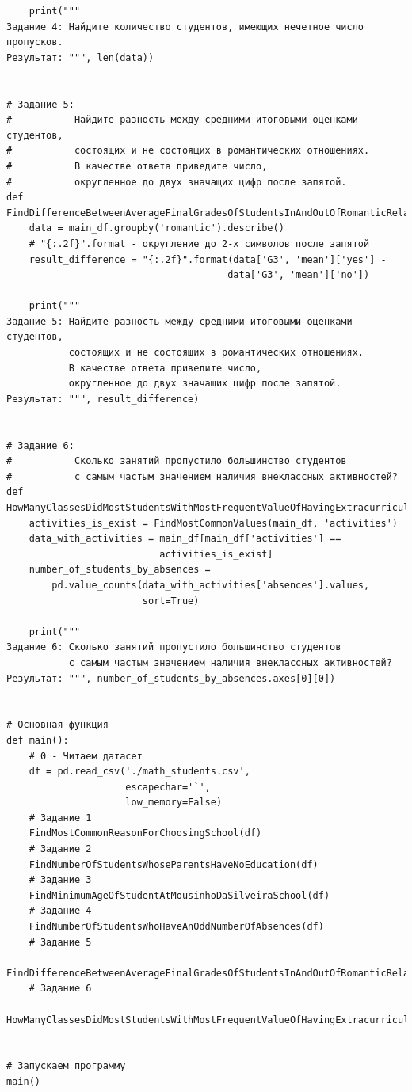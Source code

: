\documentclass[a4paper]{article}
\begin{document}
{\begin{verbatim}
    print("""
Задание 4: Найдите количество студентов, имеющих нечетное число пропусков.
Результат: """, len(data))


# Задание 5:
#           Найдите разность между средними итоговыми оценками студентов,
#           состоящих и не состоящих в романтических отношениях. 
#           В качестве ответа приведите число,
#           округленное до двух значащих цифр после запятой.
def FindDifferenceBetweenAverageFinalGradesOfStudentsInAndOutOfRomanticRelationships(main_df):
    data = main_df.groupby('romantic').describe()
    # "{:.2f}".format - округление до 2-х символов после запятой
    result_difference = "{:.2f}".format(data['G3', 'mean']['yes'] -
                                       data['G3', 'mean']['no'])

    print("""
Задание 5: Найдите разность между средними итоговыми оценками студентов,
           состоящих и не состоящих в романтических отношениях.
           В качестве ответа приведите число, 
           округленное до двух значащих цифр после запятой.
Результат: """, result_difference)


# Задание 6:
#           Сколько занятий пропустило большинство студентов 
#           с самым частым значением наличия внеклассных активностей?
def HowManyClassesDidMostStudentsWithMostFrequentValueOfHavingExtracurricularActivitiesMiss(main_df):
    activities_is_exist = FindMostCommonValues(main_df, 'activities')
    data_with_activities = main_df[main_df['activities'] ==
                           activities_is_exist]
    number_of_students_by_absences =     
        pd.value_counts(data_with_activities['absences'].values, 
                        sort=True)

    print("""
Задание 6: Сколько занятий пропустило большинство студентов
           с самым частым значением наличия внеклассных активностей?
Результат: """, number_of_students_by_absences.axes[0][0])


# Основная функция
def main():
    # 0 - Читаем датасет
    df = pd.read_csv('./math_students.csv', 
                     escapechar='`',
                     low_memory=False)
    # Задание 1
    FindMostCommonReasonForChoosingSchool(df)
    # Задание 2
    FindNumberOfStudentsWhoseParentsHaveNoEducation(df)
    # Задание 3
    FindMinimumAgeOfStudentAtMousinhoDaSilveiraSchool(df)
    # Задание 4
    FindNumberOfStudentsWhoHaveAnOddNumberOfAbsences(df)
    # Задание 5
    FindDifferenceBetweenAverageFinalGradesOfStudentsInAndOutOfRomanticRelationships(df)
    # Задание 6
    HowManyClassesDidMostStudentsWithMostFrequentValueOfHavingExtracurricularActivitiesMiss(df)


# Запускаем программу
main()
    \end{verbatim}
}
 
\end{document}
